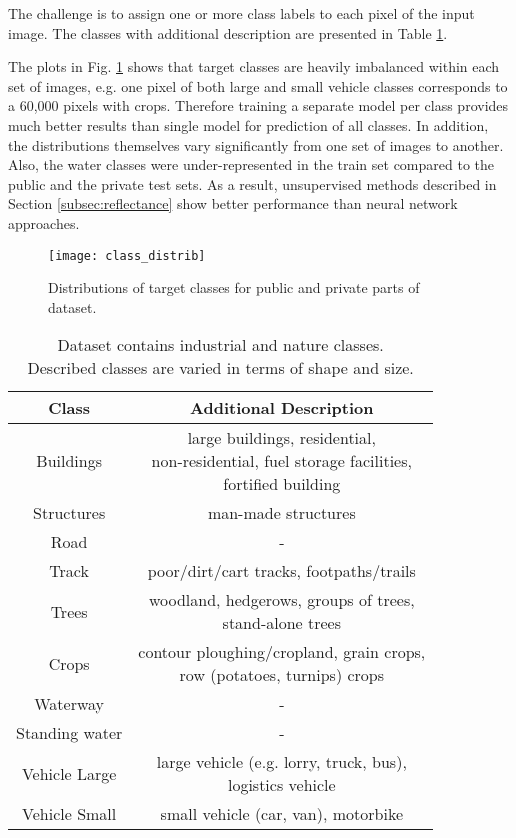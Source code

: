 \documentclass[10pt,twocolumn,letterpaper]{article}
\begin{document}
The challenge is to assign one or more class labels to each pixel of the input image. The classes with additional description are presented in Table \ref{tab:classes}.

The plots in Fig. \ref{fig:cls_distr} shows that target classes are heavily imbalanced within each set of images, e.g. one pixel of both large and small vehicle classes corresponds to a 60,000 pixels with crops. Therefore training a separate model per class provides much better results than single model for prediction of all classes. In addition, the distributions themselves vary significantly from one set of images to another. Also, the water classes were under-represented in the train set compared to the public and the private test sets. As a result, unsupervised methods described in Section \ref{subsec:reflectance} show better performance than neural network approaches.

\begin{figure}[!h]
	\captionsetup{justification=centering}
	\centering
	\texttt{[image: class\_distrib]}
	\caption{ Distributions of target classes for public and private parts of dataset.}
	\label{fig:cls_distr}
\end{figure}

\begin{table}[h!]
	\begin{center}
		\captionsetup{justification=centering}
		\begin{tabular}{|c|c|}
			\hline
			\textbf{Class}    & \textbf{Additional Description} \\ \hline
			Buildings      &  \makecell{large buildings, residential, \\ non-residential, fuel storage facilities, \\ fortified building} \\ \hline
			Structures     &  man-made structures	  \\ \hline
			Road           &  	 -  \\ \hline
			Track          & poor/dirt/cart tracks, footpaths/trails	  \\ \hline
			Trees 	       &   \makecell{woodland, hedgerows, groups of trees, \\ stand-alone trees}	  \\ \hline
			Crops 	       &  \makecell{contour ploughing/cropland, grain crops, \\ row (potatoes, turnips) crops}   \\ \hline
			Waterway       &   -   \\ \hline
			Standing water &   -   \\ \hline
			Vehicle Large  & \makecell{large vehicle (e.g. lorry, truck, bus), \\ logistics vehicle}      \\ \hline
			Vehicle Small  &  small vehicle (car, van), motorbike \\ \hline
		\end{tabular}
		\caption{Dataset contains  industrial and nature classes. \\ Described classes are varied in terms of shape and size.}\label{tab:classes}
	\end{center}
\end{table}
\end{document}
